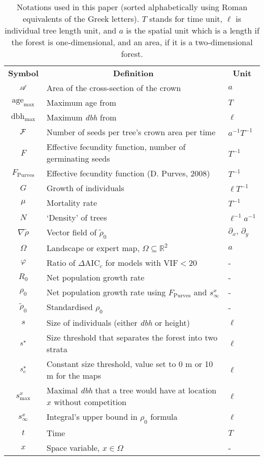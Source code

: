 \begin{table}[h]
	\centering
	\caption{Notations used in this paper (sorted alphabetically using Roman equivalents of the Greek letters). $ T $ stands for time unit, $ \ell $ is individual tree length unit, and $ a $ is the spatial unit which is a length if the forest is one-dimensional, and an area, if it is a two-dimensional forest.} \label{tab::notations}
	\begin{tabular}{@{}cll@{}}
		\toprule
		\textbf{Symbol} & \multicolumn{1}{c}{\textbf{Definition}} & \multicolumn{1}{c}{\textbf{Unit}} \\
		$ \mathscr{A} $ & Area of the cross-section of the crown &  $ a $ \\
		$ \text{age}_{\max} $ & Maximum age from \citet{Burns1990, Burns1990a} & $ T $ \\
		$ \text{dbh}_{\max} $ & Maximum \textit{dbh} from \citet{Burns1990, Burns1990a} & $ \ell $ \\
		$ \mathcal{F} $ & Number of seeds per tree's crown area per time & $ a^{-1} T^{-1} $ \\
		$ F $ & Effective fecundity function, \ie number of germinating seeds & $ T^{-1} $ \\
		$ F_{\text{Purves}} $ & Effective fecundity function (D. Purves, 2008) & $ T^{-1} $ \\
		$ G $ & Growth of individuals & $ \ell T^{-1} $ \\
		$ \mu $ & Mortality rate & $ T^{-1} $ \\
		$ N $ & `Density' of trees & $ \ell^{-1} a^{-1} $ \\
		$ \nabla \tilde \rho $ & Vector field of $ \tilde \rho_0 $ & $ \partial_x, \, \partial_y  $ \\
		$ \Omega $ & Landscape or expert map, $ \Omega \subseteq \mathds{R}^2 $ & $ a $ \\
		$ \varphi $ & Ratio of $ \Delta \text{AIC}_c $ for models with $ \text{VIF} < 20 $ & - \\
		$ R_0 $ & Net population growth rate & - \\
		$ \rho_0 $ & Net population growth rate using $ F_{\text{Purves}} $ and $ s_{\infty}^{x} $ & - \\
		$ \tilde \rho_0 $ & Standardised $ \rho_0 $ & - \\
		$ s $ & Size of individuals (either \textit{dbh} or height) & $ \ell $ \\
		$ {s}^{*} $ & Size threshold that separates the forest into two strata & $ \ell $ \\
		$ {s}^{*}_c $ & Constant size threshold, value set to 0 m or 10 m for the maps & $ \ell $ \\
		$ s_{\max}^{x} $ & Maximal \textit{dbh} that a tree would have at location $ x $ without competition & $ \ell $ \\
		$ s_{\infty}^{x} $ & Integral's upper bound in $ \rho_0 $ formula & $ \ell $ \\
		$ t $ & Time & $ T $ \\
		$ x $ & Space variable, $ x \in \Omega $ & - \\
		\bottomrule
	\end{tabular}
\end{table}

